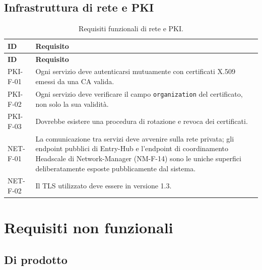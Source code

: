 \subsection{Infrastruttura di rete e PKI}

\begin{longtable}{p{2.6cm} p{\dimexpr\linewidth-2.6cm-4\tabcolsep\relax}}
\caption{Requisiti funzionali di rete e PKI.} \\
\hline
\textbf{ID} & \textbf{Requisito} \\
\hline
\endfirsthead
\hline
\textbf{ID} & \textbf{Requisito} \\
\hline
\endhead
\hline
\endfoot
\hline
\endlastfoot
PKI-F-01 & Ogni servizio deve autenticarsi mutuamente con certificati X.509 emessi da una CA valida. \\
PKI-F-02 & Ogni servizio deve verificare il campo \texttt{organization} del certificato, non solo la sua validità. \\
PKI-F-03 & Dovrebbe esistere una procedura di rotazione e revoca dei certificati. \\
NET-F-01 & La comunicazione tra servizi deve avvenire sulla rete privata; gli endpoint pubblici di Entry-Hub e l'endpoint di coordinamento Headscale di Network-Manager (NM-F-14) sono le uniche superfici deliberatamente esposte pubblicamente dal sistema. \\
NET-F-02 & Il TLS utilizzato deve essere in versione 1.3. \\
\end{longtable}

\section{Requisiti non funzionali}

\subsection{Di prodotto}

